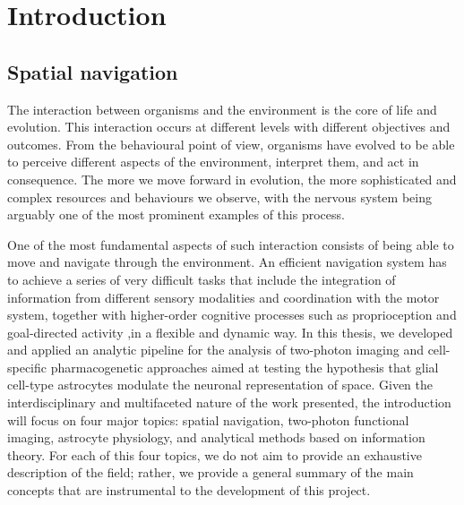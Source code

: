 
\chapter{Introduction} %

\label{Chapter1} %





\section{Spatial navigation}
\label{chap1:sec1:spatial_navigation}

The interaction between organisms and the environment is the core of life and evolution. 
This interaction occurs at different levels with different objectives and outcomes. 
From the behavioural point of view, organisms have evolved to be able to perceive different aspects of the environment, interpret them, and act in consequence. 
The more we move forward in evolution, the more sophisticated and complex resources and behaviours we observe, with the nervous system being arguably one of the most prominent examples of this process.

One of the most fundamental aspects of such interaction consists of being able to move and navigate through the environment.
An efficient navigation system has to achieve a series of very difficult tasks that include the integration of information from different sensory modalities and coordination with the motor system, together with higher-order cognitive processes such as proprioception and goal-directed activity ,in a flexible and dynamic way.
In this thesis, we developed and applied an analytic pipeline for the analysis of two-photon imaging and cell-specific pharmacogenetic approaches aimed at testing the hypothesis that glial cell-type astrocytes modulate the neuronal representation of space. 
Given the interdisciplinary and multifaceted nature of the work presented, the introduction will focus on four major topics: spatial navigation, two-photon functional imaging, astrocyte physiology, and analytical methods based on information theory.
For each of this four topics, we do not aim to provide an exhaustive description of the field; rather, we provide a general summary of the main concepts that are instrumental to the development of this project.

